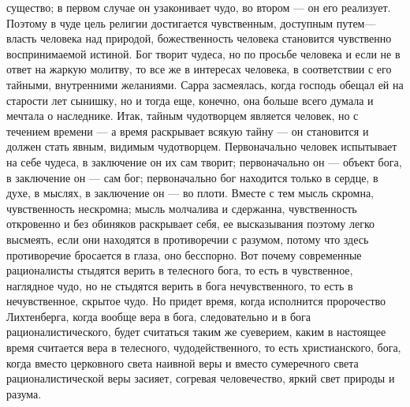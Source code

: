 \documentclass[12pt,oneside]{book}
\begin{document}
существо; в первом случае он узаконивает чудо, во втором --- он его реализует. Поэтому в чуде цель религии достигается чувственным, доступным путем--- власть человека над природой, божественность человека становится чувственно воспринимаемой истиной. Бог творит чудеса, но по просьбе человека и если не в ответ на жаркую молитву, то все же в интересах человека, в соответствии с его тайными, внутренними желаниями. Сарра засмеялась, когда господь обещал ей на старости лет сынишку, но и тогда еще, конечно, она больше всего думала и мечтала о наследнике. Итак, тайным чудотворцем является человек, но с течением времени --- а время раскрывает всякую тайну --- он становится и должен стать явным, видимым чудотворцем. Первоначально человек испытывает на себе чудеса, в заключение он их сам творит; первоначально он --- объект бога, в заключение он --- сам бог; первоначально бог находится только в сердце, в духе, в мыслях, в заключение он --- во плоти. Вместе с тем мысль скромна, чувственность нескромна; мысль молчалива и сдержанна, чувственность откровенно и без обиняков раскрывает себя, ее высказывания поэтому легко высмеять, если они находятся в противоречии с разумом, потому что здесь противоречие бросается в глаза, оно бесспорно. Вот почему современные рационалисты стыдятся верить в телесного бога, то есть в чувственное, наглядное чудо, но не стыдятся верить в бога нечувственного, то есть в нечувственное, скрытое чудо. Но придет время, когда исполнится пророчество Лихтенберга, когда вообще вера в бога, следовательно и в бога рационалистического, будет считаться таким же суеверием, каким в настоящее время считается вера в телесного, чудодейственного, то есть христианского, бога, когда вместо церковного света наивной веры и вместо сумеречного света рационалистической веры засияет, согревая человечество, яркий свет природы и разума.


\chapter{}
\end{document}
